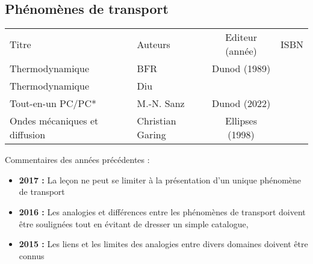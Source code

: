 \begin{headerBlock}
  \chapter{Phénomènes de transport}
    \label{LP_Transport}
\end{headerBlock}

\begin{center}
\begin{tabularx}{\textwidth}{| X | X | c | c |}
  \hline
  \rowcolor{gray!20}\multicolumn{4}{c}{Bibliographie de la leçon : } \\
  \hline 
  Titre & Auteurs & Editeur (année) & ISBN \\
  \hline
  Thermodynamique & BFR & Dunod (1989) & \\
  \hline
  Thermodynamique & Diu & & \\
  \hline 
  Tout-en-un PC/PC* & M.-N. Sanz & Dunod (2022) & \\
  \hline 
  Ondes mécaniques et diffusion & Christian Garing & Ellipses (1998) & \\
  \hline
\end{tabularx}
\end{center}

\begin{reportBlock}{Commentaires des années précédentes :}
    \begin{itemize}
        \item \textbf{2017 :} La leçon ne peut se limiter à la présentation d’un unique phénomène de transport
        \item \textbf{2016 :} Les analogies et différences entre les phénomènes de transport doivent être soulignées tout en évitant de dresser un simple catalogue,
        \item \textbf{2015 :} Les liens et les limites des analogies entre divers domaines doivent être connus
    \end{itemize}
\end{reportBlock}


